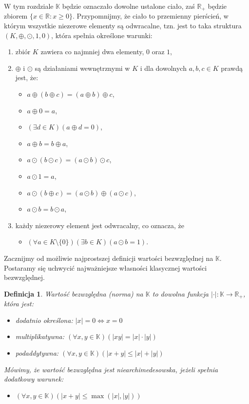 \documentclass[a4paper,fleqn]{article}
\newtheorem{dff}{Definicja}
\newenvironment{enumx}{\begin{enumerate}
	\setlength{\itemsep}{0pt}
	\setlength{\parskip}{0pt}
	\setlength{\parsep}{0pt}}
{\end{enumerate}}
\newenvironment{itemx}{\begin{itemize}
	\setlength{\itemsep}{0pt}
	\setlength{\parskip}{0pt}
	\setlength{\parsep}{0pt}}
{\end{itemize}}
\begin{document}
\begin{multicols}{2}
%



W tym rozdziale $\mathbb K$ będzie oznaczało dowolne ustalone ciało, zaś $\mathbb R_+$ będzie zbiorem $\{x\in\mathbb R:x\ge 0\}$.  Przypomnijmy, że ciało to przemienny pierścień, w którym wszystkie niezerowe elementy są odwracalne, tzn. jest to taka struktura $(K,\oplus, \odot,1,0)$, która spełnia określone warunki:
\begin{enumx}
\item zbiór $K$ zawiera co najmniej dwa elementy, $0$ oraz $1$,
\item $\oplus$ i $\odot$ są działaniami wewnętrznymi w $K$ i dla dowolnych $a,b,c\in K$ prawdą jest, że:
\begin{itemx}
\item $a  \oplus  (b  \oplus  c) = (a  \oplus  b)  \oplus  c$,
\item $a \oplus 0=a$,
\item $(\exists d \in K)(a \oplus d= 0)$,
\item $a \oplus b=b \oplus a$,
\item $a \odot (b \odot c) = (a \odot b) \odot c$,
\item $a \odot 1 = a$,
\item $a \odot (b \oplus c)= (a \odot b)  \oplus  (a \odot c)$,
\item $a \odot b = b \odot a$,
\end{itemx}
\item każdy niezerowy element jest odwracalny, co oznacza, że
\begin{itemx}
\item $(\forall a \in K\setminus\{0\})(\exists b\in K)(a\odot b = 1)$.
\end{itemx}
\end{enumx}

Zacznijmy od możliwie najprostszej definicji wartości bezwzględnej na $\mathbb K$. Postaramy się uchwycić najważniejsze własności klasycznej wartości bezwzględnej.

\begin{dff} Wartość bezwzględna (norma) na $\mathbb K$ to dowolna funkcja $|\cdot| : \mathbb K \rightarrow \mathbb R_+$, która jest:
\begin{itemx}
\item dodatnio określona: $|x| = 0 \iff x = 0$ 
\item multiplikatywna: $(\forall x, y\in\mathbb K)(|xy|=|x|\cdot|y|)$
\item podaddytywna: $(\forall x, y\in\mathbb K)(|x+y|\le|x|+|y|)$
\end{itemx}
Mówimy, że wartość bezwzględna jest niearchimedesowska, jeżeli spełnia dodatkowy warunek:
\begin{itemx}
\item $(\forall x,y\in\mathbb K)(|x+y| \le \max(|x|,|y|))$ 
\end{itemx}
\end{dff}


\end{multicols}
\end{document}
